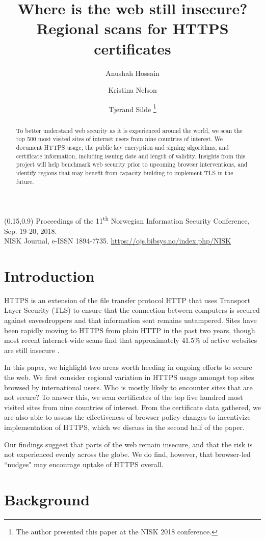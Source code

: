 \documentclass{easychair}
\title{Where is the web still insecure? \\ Regional scans for HTTPS 
certificates}
\author{
    Anushah Hossain \inst{1}
\and
    Kristina Nelson \inst{1}
\and
    Tjerand Silde \inst{1,} \inst{2} \thanks{The author presented this paper at the NISK 2018 conference.}
}
\institute{
  University of California Berkeley,
  Berkeley, California, USA\\
  \email{\{anushah.h, krisn\}@berkeley.edu}
\and
   Norwegian University of Science and Technology,
   Trondheim, Norway\\
   \email{tjerand.silde@ntnu.no}
}
\newcommand{\publishstatement}{
\begin{textblock}{0.55}(0.15,0.9)
     \noindent
     \footnotesize Proceedings of the 11\textsuperscript{th} Norwegian 
     Information Security Conference, Sep. 19-20, 2018.\\
     NISK Journal, e-ISSN 1894-7735.  \url{https://ojs.bibsys.no/index.php/NISK}
\end{textblock}
}
\begin{document}
\publishstatement
\maketitle

\begin{abstract}
  To better understand web security as it is experienced around the 
  world, we scan the top 500 most visited sites of internet users from 
  nine countries of interest. We document HTTPS usage, the public key encryption
  and signing algorithms, and certificate information, including issuing date 
  and length of validity. Insights from this project will help benchmark web
  security prior to upcoming browser interventions\cite{secureweb}, and 
  identify regions that may benefit from capacity building to implement 
  TLS in the future.
\end{abstract}


\section{Introduction}

HTTPS is an extension of the file transfer protocol HTTP that uses 
Transport Layer Security (TLS) to ensure that the connection between 
computers is secured against eavesdroppers and that information sent 
remains untampered. Sites have been rapidly moving to HTTPS from plain 
HTTP in the past two years, though most recent internet-wide scans find 
that approximately 41.5\% of active websites are still insecure 
\cite{ssllabs}.

In this paper, we highlight two areas worth heeding in ongoing efforts 
to secure the web. We first consider regional variation in HTTPS usage 
amongst top sites browsed by international users. Who is mostly likely 
to encounter sites that are not secure? To answer this, we scan 
certificates of the top five hundred most visited sites from nine 
countries of interest. From the certificate data gathered, we are also 
able to assess the effectiveness of browser policy changes to 
incentivize implementation of HTTPS, which we discuss in the second half
of the paper.

Our findings suggest that parts of the web remain insecure, and that the
risk is not experienced evenly across the globe. We do find, however, 
that browser-led ``nudges" may encourage uptake of HTTPS overall. 

\section{Background}
\end{document}
